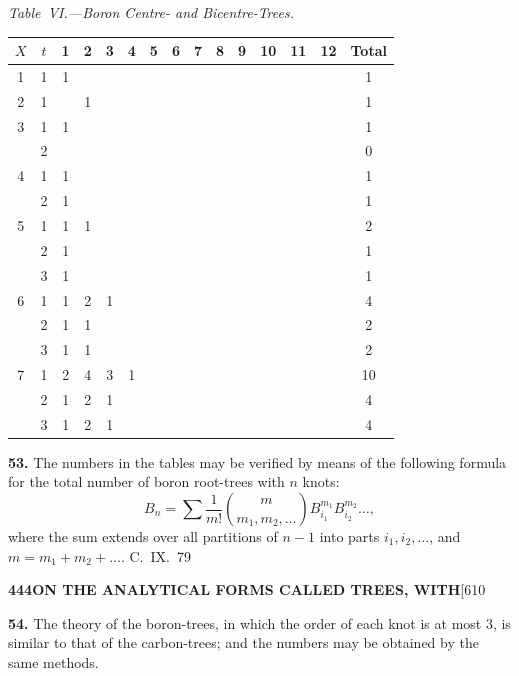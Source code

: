\documentclass[11pt,a4paper]{book}
\begin{document}
{\textit{Table~VI.---Boron Centre- and Bicentre-Trees.}
\begin{center}
\small
\begin{longtable}{|c|c|c|c|c|c|c|c|c|c|c|c|c|c|c|}
\hline
$X$ & $t$ & 1 & 2 & 3 & 4 & 5 & 6 & 7 & 8 & 9 & 10 & 11 & 12 & Total \\
\hline
\endfirsthead
1 & 1 & 1 & & & & & & & & & & & & 1 \\
\hline
2 & 1 & & 1 & & & & & & & & & & & 1 \\
\hline
3 & 1 & 1 & & & & & & & & & & & & 1 \\
  & 2 & & & & & & & & & & & & & 0 \\
\hline
4 & 1 & 1 & & & & & & & & & & & & 1 \\
  & 2 & 1 & & & & & & & & & & & & 1 \\
\hline
5 & 1 & 1 & 1 & & & & & & & & & & & 2 \\
  & 2 & 1 & & & & & & & & & & & & 1 \\
  & 3 & 1 & & & & & & & & & & & & 1 \\
\hline
6 & 1 & 1 & 2 & 1 & & & & & & & & & & 4 \\
  & 2 & 1 & 1 & & & & & & & & & & & 2 \\
  & 3 & 1 & 1 & & & & & & & & & & & 2 \\
\hline
7 & 1 & 2 & 4 & 3 & 1 & & & & & & & & & 10 \\
  & 2 & 1 & 2 & 1 & & & & & & & & & & 4 \\
  & 3 & 1 & 2 & 1 & & & & & & & & & & 4 \\
\hline
\end{longtable}
\end{center}

\medskip
\noindent\textbf{53.}
The numbers in the tables may be verified by means of the following formula for the total number of boron root-trees with $n$ knots:
\[
B_n = \sum \frac{1}{m!} \binom{m}{m_1, m_2, \ldots} B_{i_1}^{m_1} B_{i_2}^{m_2} \ldots,
\]
where the sum extends over all partitions of $n-1$ into parts $i_1, i_2, \ldots$, and $m = m_1 + m_2 + \ldots$.
\hfill C.~IX.\ 79

\newpage
\noindent\textbf{444}\hspace{\fill}\textbf{ON THE ANALYTICAL FORMS CALLED TREES, WITH}\hspace{\fill}[610

\noindent\textbf{54.}
The theory of the boron-trees, in which the order of each knot is at most 3, is similar to that of the carbon-trees; and the numbers may be obtained by the same methods.

}
\end{document}
